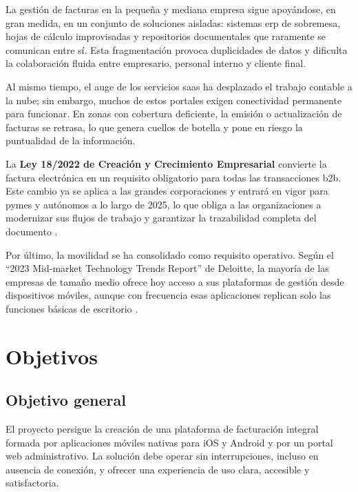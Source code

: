 \begin{large}

La gestión de facturas en la pequeña y mediana empresa sigue apoyándose, en gran medida, en un conjunto de soluciones aisladas: sistemas \gls{erp} de sobremesa, hojas de cálculo improvisadas y repositorios documentales que raramente se comunican entre sí. Esta fragmentación provoca duplicidades de datos y dificulta la colaboración fluida entre empresario, personal interno y cliente final.

Al mismo tiempo, el auge de los servicios \gls{saas} ha desplazado el trabajo contable a la nube; sin embargo, muchos de estos portales exigen conectividad permanente para funcionar. En zonas con cobertura deficiente, la emisión o actualización de facturas se retrasa, lo que genera cuellos de botella y pone en riesgo la puntualidad de la información.

La \textbf{Ley 18/2022 de Creación y Crecimiento Empresarial} convierte la factura electrónica en un requisito obligatorio para todas las transacciones \gls{b2b}. Este cambio ya se aplica a las grandes corporaciones y entrará en vigor para pymes y autónomos a lo largo de 2025, lo que obliga a las organizaciones a modernizar sus flujos de trabajo y garantizar la trazabilidad completa del documento \cite{ley18_2022}.

Por último, la movilidad se ha consolidado como requisito operativo. Según el \enquote{2023 Mid‐market Technology Trends Report} de Deloitte, la mayoría de las empresas de tamaño medio ofrece hoy acceso a sus plataformas de gestión desde dispositivos móviles, aunque con frecuencia esas aplicaciones replican solo las funciones básicas de escritorio \cite{estudio_movilidad}.

\end{large}

\section{Objetivos}

\subsection{Objetivo general}

\begin{large}

El proyecto persigue la creación de una plataforma de facturación integral formada por aplicaciones móviles nativas para iOS y Android y por un portal web administrativo. La solución debe operar sin interrupciones, incluso en ausencia de conexión, y ofrecer una experiencia de uso clara, accesible y satisfactoria.

\end{large}

